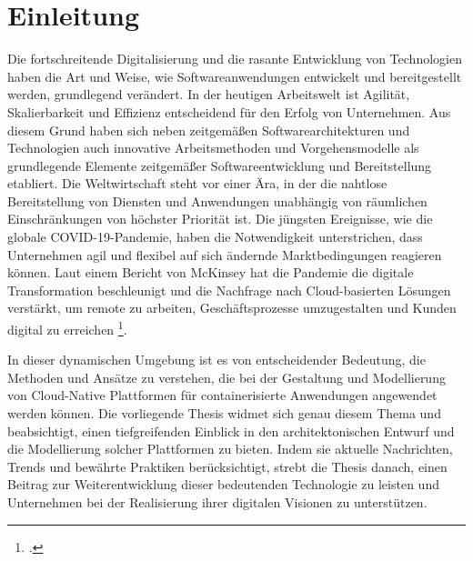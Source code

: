 \newpage
\section{Einleitung}\label{lab:einleitung}
Die fortschreitende Digitalisierung und die rasante Entwicklung von Technologien haben die Art und Weise, wie Softwareanwendungen entwickelt und bereitgestellt werden, grundlegend verändert. In der heutigen Arbeitswelt ist Agilität, Skalierbarkeit und Effizienz entscheidend für den Erfolg von Unternehmen. Aus diesem Grund haben sich neben zeitgemäßen Softwarearchitekturen und Technologien auch innovative Arbeitsmethoden und Vorgehensmodelle als grundlegende Elemente zeitgemäßer Softwareentwicklung und Bereitstellung etabliert. Die Weltwirtschaft steht vor einer Ära, in der die nahtlose Bereitstellung von Diensten und Anwendungen unabhängig von räumlichen Einschränkungen von höchster Priorität ist. Die jüngsten Ereignisse, wie die globale COVID-19-Pandemie, haben die Notwendigkeit unterstrichen, dass Unternehmen agil und flexibel auf sich ändernde Marktbedingungen reagieren können. Laut einem Bericht von McKinsey hat die Pandemie die digitale Transformation beschleunigt und die Nachfrage nach Cloud-basierten Lösungen verstärkt, um remote zu arbeiten, Geschäftsprozesse umzugestalten und Kunden digital zu erreichen \footcite[Vgl.][o.S.]{McKinsey2020}.

In dieser dynamischen Umgebung ist es von entscheidender Bedeutung, die Methoden und Ansätze zu verstehen, die bei der Gestaltung und Modellierung von Cloud-Native Plattformen für containerisierte Anwendungen angewendet werden können. Die vorliegende Thesis widmet sich genau diesem Thema und beabsichtigt, einen tiefgreifenden Einblick in den architektonischen Entwurf und die Modellierung solcher Plattformen zu bieten. Indem sie aktuelle Nachrichten, Trends und bewährte Praktiken berücksichtigt, strebt die Thesis danach, einen Beitrag zur Weiterentwicklung dieser bedeutenden Technologie zu leisten und Unternehmen bei der Realisierung ihrer digitalen Visionen zu unterstützen.


